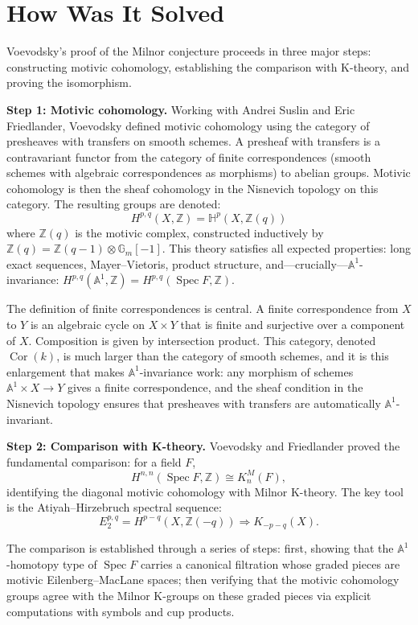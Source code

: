 \section{How Was It Solved}

Voevodsky's proof of the Milnor conjecture proceeds in three major steps: constructing motivic cohomology, establishing the comparison with K-theory, and proving the isomorphism.

\textbf{Step 1: Motivic cohomology.} Working with Andrei Suslin and Eric Friedlander, Voevodsky defined motivic cohomology using the category of presheaves with transfers on smooth schemes. A presheaf with transfers is a contravariant functor from the category of finite correspondences (smooth schemes with algebraic correspondences as morphisms) to abelian groups. Motivic cohomology is then the sheaf cohomology in the Nisnevich topology on this category. The resulting groups are denoted:
\[
H^{p,q}(X, \mathbb{Z}) = \mathbb{H}^p(X, \mathbb{Z}(q))
\]
where $\mathbb{Z}(q)$ is the motivic complex, constructed inductively by $\mathbb{Z}(q) = \mathbb{Z}(q-1) \otimes \mathbb{G}_m[-1]$. This theory satisfies all expected properties: long exact sequences, Mayer--Vietoris, product structure, and---crucially---$\mathbb{A}^1$-invariance: $H^{p,q}(\mathbb{A}^1, \mathbb{Z}) = H^{p,q}(\operatorname{Spec} F, \mathbb{Z})$.

The definition of finite correspondences is central. A finite correspondence from $X$ to $Y$ is an algebraic cycle on $X \times Y$ that is finite and surjective over a component of $X$. Composition is given by intersection product. This category, denoted $\operatorname{Cor}(k)$, is much larger than the category of smooth schemes, and it is this enlargement that makes $\mathbb{A}^1$-invariance work: any morphism of schemes $\mathbb{A}^1 \times X \to Y$ gives a finite correspondence, and the sheaf condition in the Nisnevich topology ensures that presheaves with transfers are automatically $\mathbb{A}^1$-invariant.

\textbf{Step 2: Comparison with K-theory.} Voevodsky and Friedlander proved the fundamental comparison: for a field $F$,
\[
H^{n,n}(\operatorname{Spec} F, \mathbb{Z}) \cong K^M_n(F),
\]
identifying the diagonal motivic cohomology with Milnor K-theory. The key tool is the Atiyah--Hirzebruch spectral sequence:
\[
E_2^{p,q} = H^{p-q}(X, \mathbb{Z}(-q)) \Rightarrow K_{-p-q}(X).
\]

The comparison is established through a series of steps: first, showing that the $\mathbb{A}^1$-homotopy type of $\operatorname{Spec} F$ carries a canonical filtration whose graded pieces are motivic Eilenberg--MacLane spaces; then verifying that the motivic cohomology groups agree with the Milnor K-groups on these graded pieces via explicit computations with symbols and cup products.

